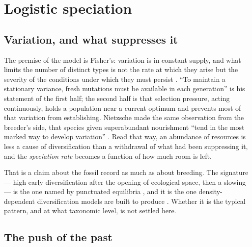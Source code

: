 
\section{Logistic speciation}
\label{var:sec:speciation}

\subsection{Variation, and what suppresses it}
\label{var:sec:variationmotivation}

The premise of the model is Fisher's: variation is in constant supply, and
what limits the number of distinct types is not the rate at which they arise
but the severity of the conditions under which they must persist
\cite{fisher1929genetical}. ``To maintain a stationary variance, fresh
mutations must be available in each generation'' is his statement of the
first half; the second half is that selection pressure, acting continuously,
holds a population near a current optimum and prevents most of that variation
from establishing. Nietzsche made the same observation from the breeder's
side, that species given superabundant nourishment ``tend in the most marked
way to develop variation''
\cite{nietzsche2013beyond}.
Read that way, an abundance of resources is less a cause of diversification
than a withdrawal of what had been suppressing it, and the \emph{speciation
rate} becomes a function of how much room is left.

That is a claim about the fossil record as much as about breeding. The
signature --- high early diversification after the opening of ecological
space, then a slowing --- is the one named by punctuated equilibria
\cite{eldredge1972punctuated}, and it is the one density-dependent
diversification models are built to produce \cite{morlon2014phylogenetic}.
Whether it is the typical pattern, and at what taxonomic level, is not
settled here.

\subsection{The push of the past}
\label{var:sec:potp}

